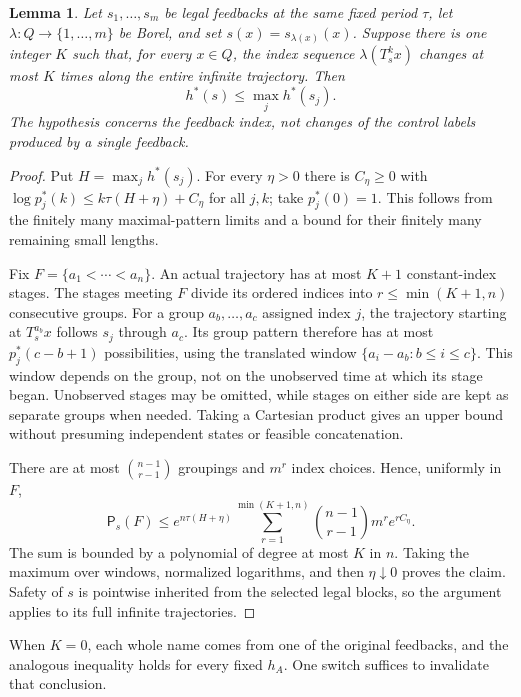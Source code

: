 \documentclass[11pt,reqno]{amsart}
\numberwithin{equation}{section}
\newtheorem{lemma}[theorem]{Lemma}
\theoremstyle{definition}
\newcommand{\Patt}{\mathsf P}
\begin{document}
\begin{lemma}\label{lem:finite-switch}
Let $s_1,\ldots,s_m$ be legal feedbacks at the same fixed period
$\tau$, let $\lambda:Q\to\{1,\ldots,m\}$ be Borel, and set
$s(x)=s_{\lambda(x)}(x)$. Suppose there is one integer $K$
such that, for every $x\in Q$, the index sequence
$\lambda(T_s^kx)$ changes at most $K$ times along the entire
infinite trajectory. Then
\[
 h^*(s)\le\max_j h^*(s_j).
\]
The hypothesis concerns the feedback index, not changes of
the control labels produced by a single feedback.
\end{lemma}
\begin{proof}
Put $H=\max_jh^*(s_j)$. For every $\eta>0$ there is
$C_\eta\ge0$ with
$\log p_j^*(k)\le k\tau(H+\eta)+C_\eta$ for all $j,k$;
take $p_j^*(0)=1$. This follows from the finitely many
maximal-pattern limits and a bound for their finitely many
remaining small lengths.

Fix $F=\{a_1<\cdots<a_n\}$. An actual trajectory has at
most $K+1$ constant-index stages. The stages meeting $F$
divide its ordered indices into $r\le\min(K+1,n)$ consecutive
groups. For a group $a_b,\ldots,a_c$ assigned index $j$,
the trajectory starting at $T_s^{a_b}x$ follows $s_j$ through
$a_c$. Its group pattern therefore has at most
$p_j^*(c-b+1)$ possibilities, using the translated window
$\{a_i-a_b:b\le i\le c\}$. This window depends on the
group, not on the unobserved time at which its stage began.
Unobserved stages may be omitted, while stages on either side
are kept as separate groups when needed. Taking a Cartesian
product gives an upper bound without presuming independent
states or feasible concatenation.

There are at most $\binom{n-1}{r-1}$ groupings and $m^r$
index choices. Hence, uniformly in $F$,
\[
 \Patt_s(F)\le e^{n\tau(H+\eta)}
 \sum_{r=1}^{\min(K+1,n)}
       \binom{n-1}{r-1}m^re^{rC_\eta}.
\]
The sum is bounded by a polynomial of degree at most $K$ in
$n$. Taking the maximum over windows, normalized logarithms,
and then $\eta\downarrow0$ proves the claim. Safety of $s$
is pointwise inherited from the selected legal blocks, so the
argument applies to its full infinite trajectories.
\end{proof}

When $K=0$, each whole name comes from one of the original
feedbacks, and the analogous inequality holds for every fixed
$h_A$. One switch suffices to invalidate that conclusion.
\end{document}
